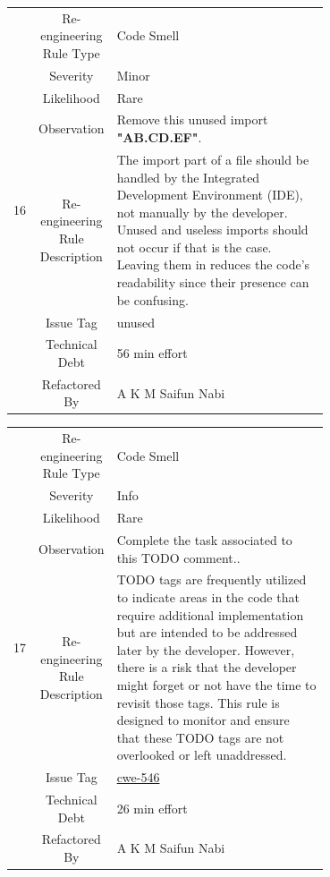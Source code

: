 \documentclass[12pt,letterpaper]{report}
\begin{document}
{\begin{table}
    \begin{tabular}{|c|c|p{0.7\linewidth}|}
    \hline   
    \multirow{8}{*}{16}
        & Re-engineering Rule Type & Code Smell \\
    \cline{2-3}
       & Severity &  Minor \\
    \cline{2-3}
       & Likelihood &  Rare\\
    \cline{2-3}
       & Observation & Remove this unused import \textbf{"AB.CD.EF"}. \\
    \cline{2-3}
       & Re-engineering Rule Description &  The import part of a file should be handled by the Integrated Development Environment (IDE), not manually by the developer. Unused and useless imports should not occur if that is the case. Leaving them in reduces the code’s readability since their presence can be confusing. \\
    \cline{2-3}
       & Issue Tag & unused \\
    \cline{2-3}
       & Technical Debt & 56 min effort  \\
    \cline{2-3}
       & Refactored By & A K M Saifun Nabi \\
    \hline
    \end{tabular}
\end{table}

\vspace*{0.1 cm}
\begin{table}
    \begin{tabular}{|c|c|p{0.7\linewidth}|}
    \hline   
    \multirow{8}{*}{17}
        & Re-engineering Rule Type & Code Smell \\
    \cline{2-3}
       & Severity &  Info \\
    \cline{2-3}
       & Likelihood &  Rare\\
    \cline{2-3}
       & Observation & Complete the task associated to this TODO comment..  \\
    \cline{2-3}
       & Re-engineering Rule Description &  TODO tags are frequently utilized to indicate areas in the code that require additional implementation but are intended to be addressed later by the developer. However, there is a risk that the developer might forget or not have the time to revisit those tags. This rule is designed to monitor and ensure that these TODO tags are not overlooked or left unaddressed. \\
    \cline{2-3}
       & Issue Tag & \href{https://cwe.mitre.org/data/definitions/546}{cwe-546} \\
    \cline{2-3}
       & Technical Debt & 26 min effort  \\
    \cline{2-3}
       & Refactored By & A K M Saifun Nabi \\
    \hline
    \end{tabular}
\end{table}
\pagebreak
}
\end{document}
